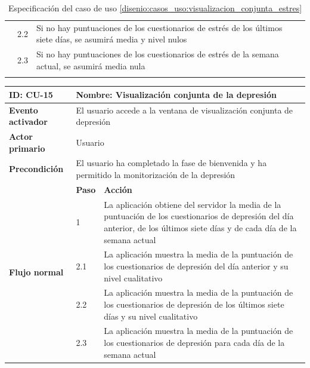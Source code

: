 \begin{table}[h]
\begin{tabularx}{\textwidth}{|l|l|X|}
                    \cline{2-3} & 2.2 & Si no hay puntuaciones de los cuestionarios de estrés de los últimos siete días, se asumirá media y nivel nulos \\
                    \cline{2-3} & 2.3 & Si no hay puntuaciones de los cuestionarios de estrés de la semana actual, se asumirá media nula \\
                    \hline
                    \caption{Especificación del caso de uso \ref{disenio:casos_uso:visualizacion_conjunta_estres}}
                    \label{tabla:casos_uso:visualizacion_conjunta_estres}
                \end{tabularx}
            \end{table}

            \begin{table}[h]
                \centering
                \begin{tabularx}{\textwidth}{|l|l|X|}
                    \hline
                    \textbf{ID:} CU-15 & \multicolumn{2}{|X|}{\textbf{Nombre}: Visualización conjunta de la depresión} \\
                    \hline
                    \textbf{Evento activador} & \multicolumn{2}{|X|}{El usuario accede a la ventana de visualización conjunta de depresión} \\
                    \hline
                    \textbf{Actor primario} & \multicolumn{2}{|X|}{Usuario} \\
                    \hline
                    \textbf{Precondición} & \multicolumn{2}{|X|}{El usuario ha completado la fase de bienvenida y ha permitido la monitorización de la depresión} \\
                    \hline
                    \multirow{6}{*}{\textbf{Flujo normal}} & \textbf{Paso} & \textbf{Acción} \\
                    \cline{2-3} & 1 & La aplicación obtiene del servidor la media de la puntuación de los cuestionarios de depresión del día anterior, de los últimos siete días y de cada día de la semana actual \\
                    \cline{2-3} & 2.1 & La aplicación muestra la media de la puntuación de los cuestionarios de depresión del día anterior y su nivel cualitativo \\
                    \cline{2-3} & 2.2 & La aplicación muestra la media de la puntuación de los cuestionarios de depresión de los últimos siete días y su nivel cualitativo \\
                    \cline{2-3} & 2.3 & La aplicación muestra la media de la puntuación de los cuestionarios de depresión para cada día de la semana actual \\

\end{tabularx}
\end{table}
